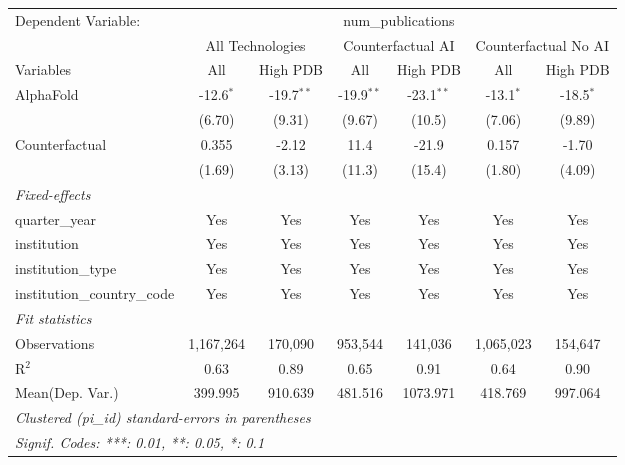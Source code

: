 \begingroup
\centering
\begin{tabular}{lcccccc}
   \tabularnewline \midrule \midrule
   Dependent Variable: & \multicolumn{6}{c}{num\_publications}\\
 & \multicolumn{2}{c}{All Technologies} & \multicolumn{2}{c}{Counterfactual AI} & \multicolumn{2}{c}{Counterfactual No AI} \\
\cmidrule(lr){1-1}\cmidrule(lr){2-3} \cmidrule(lr){4-5} \cmidrule(lr){6-7}
Variables & \multicolumn{1}{c}{All} & \multicolumn{1}{c}{High PDB} & \multicolumn{1}{c}{All} & \multicolumn{1}{c}{High PDB} & \multicolumn{1}{c}{All} & \multicolumn{1}{c}{High PDB} \\
\cmidrule(lr){1-1}\cmidrule(lr){2-2} \cmidrule(lr){3-3} \cmidrule(lr){4-4} \cmidrule(lr){5-5} \cmidrule(lr){6-6} \cmidrule(lr){7-7}
   AlphaFold                    & -12.6$^{*}$ & -19.7$^{**}$ & -19.9$^{**}$ & -23.1$^{**}$ & -13.1$^{*}$ & -18.5$^{*}$\\   
                                & (6.70)      & (9.31)       & (9.67)       & (10.5)       & (7.06)      & (9.89)\\   
   Counterfactual               & 0.355       & -2.12        & 11.4         & -21.9        & 0.157       & -1.70\\   
                                & (1.69)      & (3.13)       & (11.3)       & (15.4)       & (1.80)      & (4.09)\\   
   \midrule
   \emph{Fixed-effects}\\
   quarter\_year                & Yes         & Yes          & Yes          & Yes          & Yes         & Yes\\  
   institution                  & Yes         & Yes          & Yes          & Yes          & Yes         & Yes\\  
   institution\_type            & Yes         & Yes          & Yes          & Yes          & Yes         & Yes\\  
   institution\_country\_code   & Yes         & Yes          & Yes          & Yes          & Yes         & Yes\\  
   \midrule
   \emph{Fit statistics}\\
   Observations                 & 1,167,264   & 170,090      & 953,544      & 141,036      & 1,065,023   & 154,647\\  
   R$^2$                        & 0.63        & 0.89         & 0.65         & 0.91         & 0.64        & 0.90\\  
Mean(Dep. Var.) & 399.995 & 910.639 & 481.516 & 1073.971 & 418.769 & 997.064 \\
   \midrule \midrule
   \multicolumn{7}{l}{\emph{Clustered (pi\_id) standard-errors in parentheses}}\\
   \multicolumn{7}{l}{\emph{Signif. Codes: ***: 0.01, **: 0.05, *: 0.1}}\\
\end{tabular}
\par\endgroup
